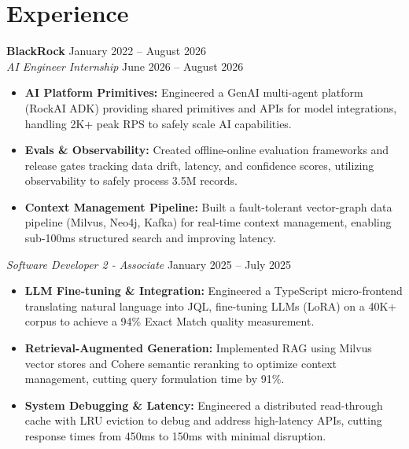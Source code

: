 \documentclass[11pt,a4paper]{article}
\begin{document}
\section{Experience}
\noindent
\textbf{BlackRock} \hfill January 2022 -- August 2026 \\
\textit{AI Engineer Internship} \hfill June 2026 -- August 2026
\begin{itemize}[leftmargin=*,noitemsep,topsep=0pt]
    \item \textbf{AI Platform Primitives:} Engineered a GenAI multi-agent platform (RockAI ADK) providing shared primitives and APIs for model integrations, handling 2K+ peak RPS to safely scale AI capabilities.
    \item \textbf{Evals \& Observability:} Created offline-online evaluation frameworks and release gates tracking data drift, latency, and confidence scores, utilizing observability to safely process 3.5M records.
    \item \textbf{Context Management Pipeline:} Built a fault-tolerant vector-graph data pipeline (Milvus, Neo4j, Kafka) for real-time context management, enabling sub-100ms structured search and improving latency.
\end{itemize}

\vspace{3pt}
\noindent
\textit{Software Developer 2 - Associate} \hfill January 2025 -- July 2025
\begin{itemize}[leftmargin=*,noitemsep,topsep=0pt]
    \item \textbf{LLM Fine-tuning \& Integration:} Engineered a TypeScript micro-frontend translating natural language into JQL, fine-tuning LLMs (LoRA) on a 40K+ corpus to achieve a 94\% Exact Match quality measurement.
    \item \textbf{Retrieval-Augmented Generation:} Implemented RAG using Milvus vector stores and Cohere semantic reranking to optimize context management, cutting query formulation time by 91\%.
    \item \textbf{System Debugging \& Latency:} Engineered a distributed read-through cache with LRU eviction to debug and address high-latency APIs, cutting response times from 450ms to 150ms with minimal disruption.
\end{itemize}
\end{document}
